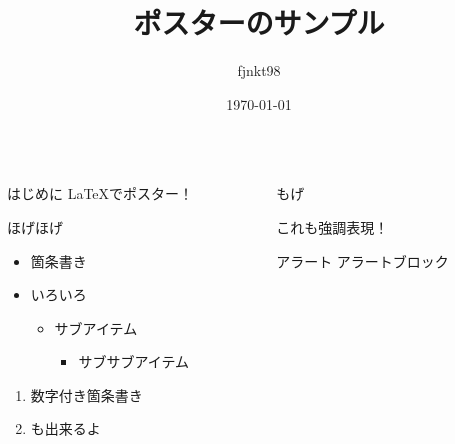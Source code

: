 \documentclass[dvipdfmx, final, t]{beamer}
\title{ポスターのサンプル}
\author{fjnkt98}
\institute{NITIC}
\date{\today}
\begin{document}
\begin{frame}
  \begin{columns}[t]
    \begin{column}{.45\linewidth}
      \begin{block}{はじめに}
        \LaTeX でポスター！
      \end{block}

      \begin{block}{ほげほげ}
        \begin{itemize}
          \item 箇条書き
          \item いろいろ
          \begin{itemize}
            \item サブアイテム
            \begin{itemize}
              \item サブサブアイテム
            \end{itemize}
          \end{itemize}
        \end{itemize}

        \begin{enumerate}
          \item 数字付き箇条書き
          \item も出来るよ
        \end{enumerate}
      \end{block}
    \end{column}

    \begin{column}{.45\linewidth}
      \begin{block}{もげ}

        \alert{これも強調表現！}
      \end{block}

      \begin{alertblock}{アラート}
        アラートブロック
      \end{alertblock}
    \end{column}
  \end{columns}
\end{frame}
\end{document}
